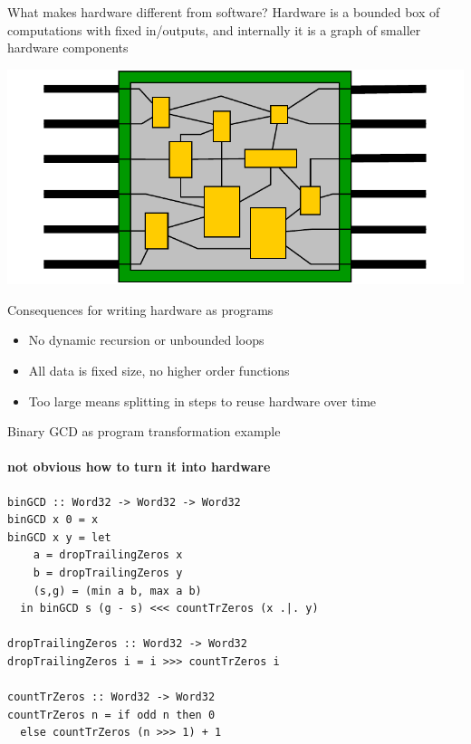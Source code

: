 \documentclass[pdf]{beamer}
\begin{document}
\begin{frame}{What makes hardware different from software?}
Hardware is a bounded box of computations with fixed in/outputs, and internally it is a graph of smaller hardware components
\begin{center}
\includegraphics[scale=0.6]{schematic}
\end{center}

\begin{block}{Consequences for writing hardware as programs}
\begin{itemize}
\item No dynamic recursion or unbounded loops
\item All data is fixed size, no higher order functions
\item Too large means splitting in steps to reuse hardware over time
\end{itemize}
\end{block}
\end{frame}


\begin{frame}[fragile]{Binary GCD as program transformation example}
\framesubtitle{not obvious how to turn it into hardware}
\begin{block}{}
\begin{verbatim}
binGCD :: Word32 -> Word32 -> Word32       
binGCD x 0 = x
binGCD x y = let
    a = dropTrailingZeros x
    b = dropTrailingZeros y
    (s,g) = (min a b, max a b)
  in binGCD s (g - s) <<< countTrZeros (x .|. y)

dropTrailingZeros :: Word32 -> Word32
dropTrailingZeros i = i >>> countTrZeros i

countTrZeros :: Word32 -> Word32
countTrZeros n = if odd n then 0 
  else countTrZeros (n >>> 1) + 1
\end{verbatim}
\end{block}

\end{frame}
\end{document}
